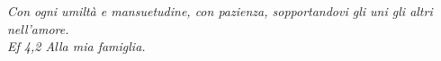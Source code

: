 \begin{titlepage}                       %
\thispagestyle{empty}                   %
\topmargin=6.5cm                        %
\raggedleft                             %
\large                                  %
\em
Con ogni umiltà e mansuetudine, con pazienza, sopportandovi gli uni gli altri nell’amore.\\
\textit{Ef 4,2}                                    %
Alla mia famiglia.                      
\newpage                                %
\clearpage{\pagestyle{empty}\cleardoublepage}
\end{titlepage}